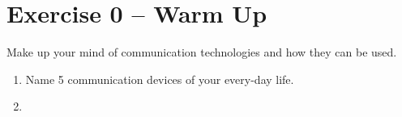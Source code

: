 {}
\section*{Exercise 0 -- Warm Up}

Make up your mind of communication technologies and how they can be used.

\begin{enumerate}
	\item Name 5 communication devices of your every-day life.
	\item 
\end{enumerate}